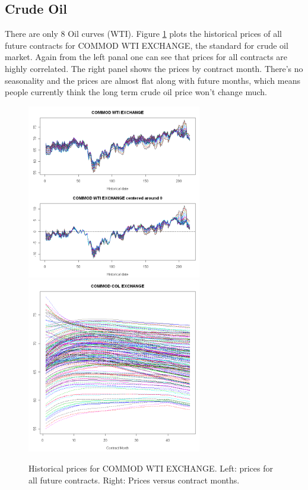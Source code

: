 \subsection{Crude Oil}
There are only 8 Oil curves (WTI). 
Figure \ref{wti-hist} plots the historical prices of all
future contracts for COMMOD WTI EXCHANGE,  the standard
for crude oil market. Again from the left panal
one can see that prices for all contracts 
are highly correlated.
The right panel shows the prices by contract month.
There's no seasonality and the prices are almost
flat along with future months, which means people currently
think the long term crude oil price won't change much.

\begin{figure}[htbp]
\centering
\includegraphics[width=3in, height=3in]{figures/wti01.png}
\includegraphics[width=3in, height=3in]{figures/wti02.png}
\caption{Historical prices for COMMOD WTI EXCHANGE. 
Left: prices for all future contracts. 
Right: Prices versus contract months.}
\label{wti-hist}
\end{figure}

